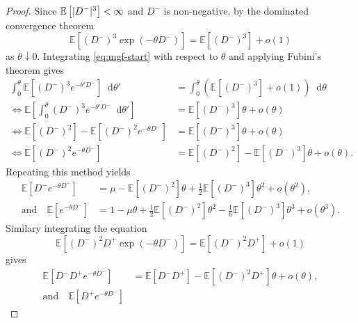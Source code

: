 \documentclass[draft]{scrartcl}
\newcommand{\E}{\mathbb E}
\newcommand{\littleo}{o}
\DeclarePairedDelimiter{\abs}{\lvert}{\rvert}
\newcommand*\dif{\mathop{}\!\mathrm{d}}
\begin{document}
\begin{proof}
    Since $\E\left[\abs{D^-}^3\right] < \infty$ and $D^-$ is non-negative, by the dominated convergence theorem
    \begin{equation}
        \E \left[ (D^-)^3 \exp(-\theta D^-) \right] = \E \left[ (D^-)^3 \right] + \littleo(1)
        \label{eq:mgf-start}
    \end{equation}
    as $\theta \downarrow 0$. Integrating \cref{eq:mgf-start} with respect to $\theta$ and applying Fubini's theorem gives
    \begin{align}
        \int_0^{\theta} \E \left[ (D^-)^3 e^{-\theta' D^-}\right] \dif \theta'
        &= \int_0^{\theta} (\E \left[ (D^-)^3 \right] + \littleo(1) ) \dif \theta \\
        \iff \E \left[ \int_0^{\theta} (D^-)^3 e^{-\theta' D^-} \dif \theta' \right]
        &= \E \left[ (D^-)^3 \right] \theta + \littleo(\theta) \\
        \iff \E \left[ (D^-)^2 \right] - \E \left[ (D^-)^2 e^{-\theta D^-} \right]
        &= \E \left[ (D^-)^3 \right] \theta + \littleo(\theta) \\
        \iff \E \left[ (D^-)^2 e^{-\theta D^-} \right]
        &= \E \left[ (D^-)^2 \right] - \E \left[ (D^-)^3 \right] \theta + \littleo(\theta).
        \label{eq:asym20}
    \end{align}
    Repeating this method yields
    \begin{align}
        \E \left[ D^- e^{-\theta D^-} \right]
        &= \mu - \E \left[ (D^-)^2 \right] \theta + \tfrac{1}{2} \E \left[ (D^-)^3 \right] \theta^2 + \littleo(\theta^2),
        \label{eq:asym10}\\
        \text{and} \quad \E \left[ e^{-\theta D^-} \right]
        &= 1 - \mu \theta + \tfrac{1}{2} \E \left[ (D^-)^2 \right] \theta^2 - \tfrac{1}{6} \E \left[ (D^-)^3 \right] \theta^3 + \littleo(\theta^3).
        \label{eq:asym00}
    \end{align}
    Similary integrating the equation
    \begin{equation}
        \E \left[ (D^-)^2 D^+ \exp(-\theta D^-) \right] = \E \left[ (D^-)^2 D^+ \right] + \littleo(1)
    \end{equation}
    gives
    \begin{align}
        \E \left[ D^- D^+ e^{-\theta D^-} \right]
        &= \E \left[ D^- D^+ \right] - \E \left[ (D^-)^2 D^+ \right] \theta + \littleo(\theta),
        \label{eq:asym11}\\
        \text{and} \quad \E \left[ D^+ e^{-\theta D^-} \right]

\end{align}
\end{proof}
\end{document}
